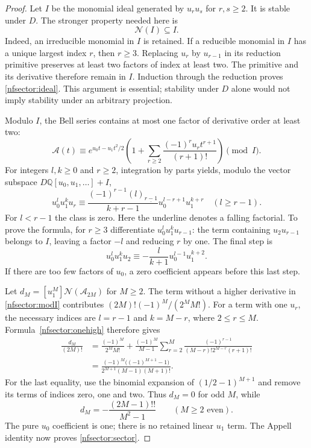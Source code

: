 \documentclass[11pt,a4paper]{article}
\numberwithin{equation}{section}
\theoremstyle{definition}
\theoremstyle{remark}
\begin{document}
\begin{proof}
Let $I$ be the monomial ideal generated by $u_r u_s$ for $r,s\ge2$.
It is stable under $D$.  The stronger property needed here is
\begin{equation}\label{nfsector:ideal}
                   \mathcal N(I)\subseteq I.
\end{equation}
Indeed, an irreducible monomial in $I$ is retained.  If a reducible
monomial in $I$ has a unique largest index $r$, then $r\ge3$.
Replacing $u_r$ by $u_{r-1}$ in its reduction primitive preserves at
least two factors of index at least two.  The primitive and its
derivative therefore remain in $I$.  Induction through the reduction
proves \eqref{nfsector:ideal}.  This argument is essential; stability
under $D$ alone would not imply stability under an arbitrary projection.

Modulo $I$, the Bell series contains at most one factor of derivative
order at least two:
\begin{equation}\label{nfsector:modI}
 \mathcal A(t)\equiv
 e^{u_0t-u_1t^2/2}
 \left(1+\sum_{r\ge2}\frac{(-1)^ru_rt^{r+1}}{(r+1)!}\right)
 \pmod I.
\end{equation}
For integers $l,k\ge0$ and $r\ge2$, integration by parts yields,
modulo the vector subspace $D\mathbb Q[u_0,u_1,\ldots]+I$,
\begin{equation}\label{nfsector:onehigh}
 u_0^l u_1^k u_r\equiv
 \frac{(-1)^{r-1}(l)_{\underline{r-1}}}{k+r-1}
       u_0^{l-r+1}u_1^{k+r}
       \quad(l\ge r-1).
\end{equation}
For $l<r-1$ the class is zero.  Here the underline denotes a falling
factorial.  To prove the formula, for $r\ge3$ differentiate
$u_0^l u_1^k u_{r-1}$: the term containing $u_2u_{r-1}$ belongs
to $I$, leaving a factor $-l$ and reducing $r$ by one.
The final step is
\[
 u_0^l u_1^k u_2\equiv
       -\frac{l}{k+1}u_0^{l-1}u_1^{k+2}.
\]
If there are too few factors of $u_0$, a zero coefficient appears
before this last step.

Let $d_M=[u_1^M]\mathcal N(\mathcal A_{2M})$ for $M\ge2$.
The term without a higher derivative in \eqref{nfsector:modI}
contributes $(2M)!(-1)^M/(2^MM!)$.  For a term with one $u_r$,
the necessary indices are $l=r-1$ and $k=M-r$, where $2\le r\le M$.
Formula~\eqref{nfsector:onehigh} therefore gives
\begin{align*}
 \frac{d_M}{(2M)!}
 &=\frac{(-1)^M}{2^MM!}
   +\frac{(-1)^M}{M-1}
       \sum_{r=2}^{M}
       \frac{(-1)^{r-1}}{(M-r)!2^{M-r}(r+1)!}\\
 &=\frac{(-1)^M\bigl((-1)^{M+1}-1\bigr)}
       {2^{M+1}(M-1)(M+1)!}.
\end{align*}
For the last equality, use the binomial expansion of
$(1/2-1)^{M+1}$ and remove its terms of indices zero, one and two.
Thus $d_M=0$ for odd $M$, while
\[
 d_M=-\frac{(2M-1)!!}{M^2-1}\qquad(M\ge2\text{ even}).
\]
The pure $u_0$ coefficient is one; there is no retained linear $u_1$
term.  The Appell identity now proves \eqref{nfsector:sector}.


\end{proof}
\end{document}
